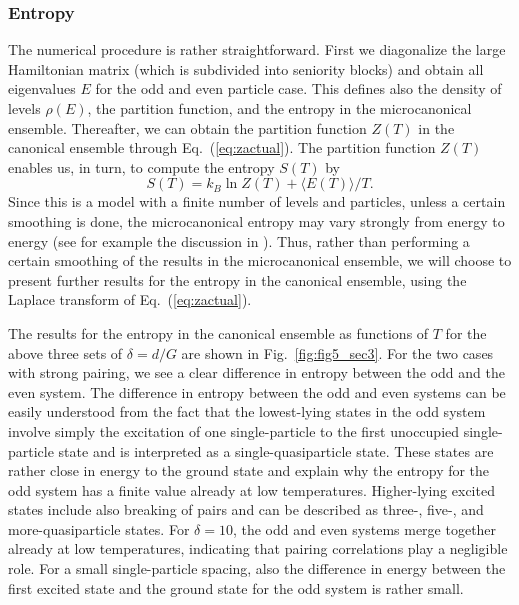 \documentclass[rmp,preprint,aps,floatfix]{revtex4}
\begin{document}
\subsubsection{Entropy}

The numerical procedure is rather straightforward. 
First we diagonalize the large Hamiltonian matrix (which is 
subdivided into seniority blocks) and obtain all 
eigenvalues $E$ for the odd and even particle case. This defines also 
the density of levels $\rho(E)$, the partition function, and 
the entropy in the microcanonical ensemble. Thereafter, we can 
obtain the partition function $Z(T)$ in the canonical ensemble through 
Eq.\ (\ref{eq:zactual}). The partition function 
$Z(T)$ enables us, in turn, to compute the entropy $S(T)$ by
\begin{equation}
    S(T)=k_B \ln Z(T)+\langle E(T)\rangle/T.
    \label{eq:canentropy}
\end{equation}
Since this is a model with a finite number of levels and 
particles, unless a certain smoothing is done, 
the microcanonical entropy may vary strongly from energy to energy
(see for example the discussion in \cite{entropy2000}).
Thus, rather than performing a 
certain smoothing of the results in the microcanonical ensemble, 
we will choose to present further results 
for the entropy in the canonical ensemble, using the 
Laplace transform of Eq.\ (\ref{eq:zactual}). 

The results for the entropy in the canonical ensemble 
as functions of $T$ for the above three sets of 
$\delta=d/G$ are shown in Fig.\ \ref{fig:fig5_sec3}. For the two 
cases with strong pairing, we see a clear difference in entropy 
between the odd and the even system. The difference in 
entropy between the odd and even systems can be easily 
understood from the fact that the lowest-lying states in 
the odd system involve simply the excitation of one single-particle 
to the first unoccupied single-particle state and is 
interpreted as a single-quasiparticle state. These states are 
rather close in energy to the ground state and explain 
why the entropy for the odd system has a finite value 
already at low temperatures. Higher-lying excited 
states include also breaking of pairs and can be 
described as three-, five-, and more-quasiparticle states. 
For $\delta=10$, the odd and even systems 
merge together already at low temperatures, indicating that 
pairing correlations play a negligible role. For a small single-particle 
spacing, also the difference in energy between the first 
excited state and the ground state for the odd system is rather small. 
\end{document}
